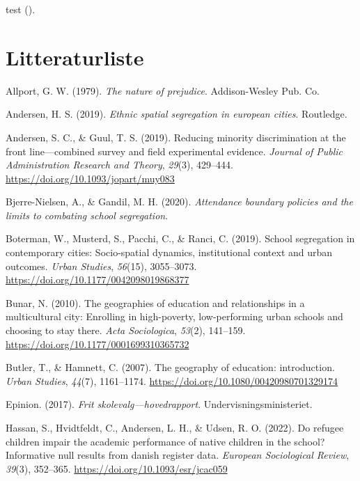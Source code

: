 \documentclass[
]{book}
\newlength{\cslhangindent}
\newenvironment{CSLReferences}[2] %
 {\begin{list}{}{%
  \setlength{\itemindent}{0pt}
  \setlength{\leftmargin}{0pt}
  \setlength{\parsep}{0pt}
  \ifodd #1
   \setlength{\leftmargin}{\cslhangindent}
   \setlength{\itemindent}{-1\cslhangindent}
  \fi
  \setlength{\itemsep}{#2\baselineskip}}}
 {\end{list}}
\begin{document}
test ().

\chapter*{Litteraturliste}\label{litteraturliste}

\label{refs}
\begin{CSLReferences}{1}{0}
Allport, G. W. (1979). \emph{The nature of prejudice}. Addison-Wesley Pub. Co.

Andersen, H. S. (2019). \emph{Ethnic spatial segregation in european cities}. Routledge.

Andersen, S. C., \& Guul, T. S. (2019). Reducing minority discrimination at the front line---combined survey and field experimental evidence. \emph{Journal of Public Administration Research and Theory}, \emph{29}(3), 429--444. \url{https://doi.org/10.1093/jopart/muy083}

Bjerre-Nielsen, A., \& Gandil, M. H. (2020). \emph{Attendance boundary policies and the limits to combating school segregation}.

Boterman, W., Musterd, S., Pacchi, C., \& Ranci, C. (2019). School segregation in contemporary cities: Socio-spatial dynamics, institutional context and urban outcomes. \emph{Urban Studies}, \emph{56}(15), 3055--3073. \url{https://doi.org/10.1177/0042098019868377}

Bunar, N. (2010). The geographies of education and relationships in a multicultural city: Enrolling in high-poverty, low-performing urban schools and choosing to stay there. \emph{Acta Sociologica}, \emph{53}(2), 141--159. \url{https://doi.org/10.1177/0001699310365732}

Butler, T., \& Hamnett, C. (2007). The geography of education: introduction. \emph{Urban Studies}, \emph{44}(7), 1161--1174. \url{https://doi.org/10.1080/00420980701329174}

Epinion. (2017). \emph{Frit skolevalg---hovedrapport}. Undervisningsministeriet.

Hassan, S., Hvidtfeldt, C., Andersen, L. H., \& Udsen, R. O. (2022). Do refugee children impair the academic performance of native children in the school? Informative null results from danish register data. \emph{European Sociological Review}, \emph{39}(3), 352--365. \url{https://doi.org/10.1093/esr/jcac059}


\end{CSLReferences}
\end{document}
